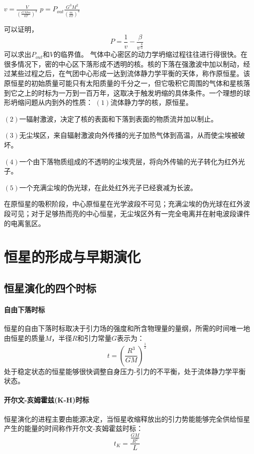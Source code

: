 \begin{large}
	$v=\frac{V}{\left(\frac{GMm}{kT}\right)^3}$ \qquad $p=P_{out}\frac{G^3M^2}{\left(\frac{m}{kT}\right)^4}$
\end{large}

可以证明，
\begin{equation}
	P=\frac{1}{v}-\frac{\beta}{v^{\frac{4}{3}}}
\end{equation}
可以求出$P_{out}$和$V$的临界值。
气体中心密区的动力学坍缩过程往往进行得很快。在很多情况下，密的中心区下落形成不透明的核。核的下落在强激波中加以制动，经过某些过程之后，在气团中心形成一达到流体静力学平衡的天体，称作原恒星。该原恒星的初始质量可能只有太阳质量的千分之一，但它吸积它周围的气体和星核落到它之上的时标为一万到一百万年，这取决于触发坍缩的具体条件。一个理想的球形坍缩问题从内到外的性质：
$\left(1\right)$流体静力学的核，原恒星。

$\left(2\right)$一辐射激波，决定了核的表面和下落到表面的物质流并加以制止。

$\left(3\right)$无尘埃区，来自辐射激波向外传播的光子加热气体到高温，从而使尘埃被破坏。

$\left(4\right)$一个由下落物质组成的不透明的尘埃壳层，将向外传输的光子转化为红外光子。

$\left(5\right)$一个充满尘埃的伪光球，在此处红外光子已经衰减为长波。

在原恒星的吸积阶段，中心原恒星在光学波段不可见；充满尘埃的伪光球在红外波段可见；对于足够热而亮的中心恒星，无尘埃区外有一完全电离并在射电波段课件的电离氢区。
\section{恒星的形成与早期演化}
\subsection{恒星演化的四个时标}
\paragraph{自由下落时标}恒星的自由下落时标取决于引力场的强度和所含物理量的量纲，所需的时间唯一地由恒星的质量$M$，半径$R$和引力常量$G$表示为：
\begin{equation}
	t=\left(\frac{R^3}{GM}\right)^{\frac{1}{2}}
\end{equation}
处于稳定状态的恒星能够很快调整自身压力-引力的不平衡，处于流体静力学平衡状态。
\paragraph{开尔文-亥姆霍兹(K-H)时标}恒星演化的进程主要由能源决定，当恒星收缩释放出的引力势能能够完全供给恒星产生的能量的时间称作开尔文-亥姆霍兹时标：
\begin{equation}
	t_{K}=\frac{\frac{GM}{R^2}}{L}
\end{equation}
